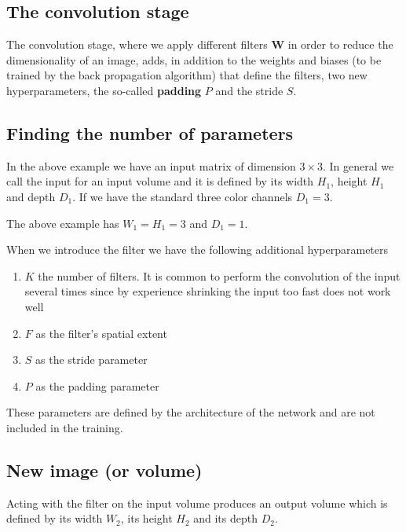 \documentclass[%
oneside,                 %
final,                   %
10pt]{article}
\begin{document}
\subsection{The convolution stage}

The convolution stage, where we apply different filters $\bm{W}$ in
order to reduce the dimensionality of an image, adds, in addition to
the weights and biases (to be trained by the back propagation
algorithm) that define the filters, two new hyperparameters, the so-called
\textbf{padding} $P$ and the stride $S$.

\subsection{Finding the number of parameters}

In the above example we have an input matrix of dimension $3\times
3$. In general we call the input for an input volume and it is defined
by its width $H_1$, height $H_1$ and depth $D_1$. If we have the
standard three color channels $D_1=3$.

The above example has $W_1=H_1=3$ and $D_1=1$.

When we introduce the filter we have the following additional hyperparameters
\begin{enumerate}
\item $K$ the number of filters. It is common to perform the convolution of the input several times since by experience shrinking the input too fast does not work well

\item $F$ as the filter's spatial extent

\item $S$ as the stride parameter

\item $P$ as the padding parameter
\end{enumerate}

\noindent
These parameters are defined by the architecture of the network and are not included in the training.

\subsection{New image (or volume)}

Acting with the filter on the input volume produces an output volume
which is defined by its width $W_2$, its height $H_2$ and its depth
$D_2$.
\end{document}
